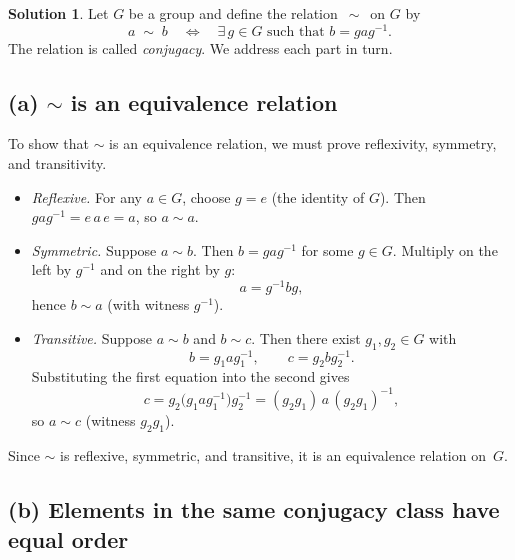 \documentclass[12pt]{article}
\theoremstyle{definition} %
\newtheorem{solution}{Solution}
\theoremstyle{plain} %
\begin{document}
  \begin{solution}
    Let $G$ be a group and define the relation $\,\sim\,$ on $G$ by  
    \[
         a\;\sim\;b 
         \quad\Longleftrightarrow\quad 
         \exists\,g\in G \text{ such that } b = g a g^{-1}.
    \]
    The relation is called \emph{conjugacy}.  We address each part in turn.
    
    \subsection*{(a)  $\sim$ is an equivalence relation}
    
    To show that $\sim$ is an equivalence relation, we must prove reflexivity, symmetry, and transitivity.
    
    \begin{itemize}
        \item\emph{Reflexive.}  
              For any $a\in G$, choose $g=e$ (the identity of $G$).  
              Then $gag^{-1}=e\,a\,e=a$, so $a\sim a$.
    
        \item\emph{Symmetric.}  
              Suppose $a\sim b$.  
              Then $b=gag^{-1}$ for some $g\in G$.  
              Multiply on the left by $g^{-1}$ and on the right by $g$:
              \[
                  a = g^{-1} b g,
              \]
              hence $b\sim a$ (with witness $g^{-1}$).
    
        \item\emph{Transitive.}  
              Suppose $a\sim b$ and $b\sim c$.  
              Then there exist $g_1,g_2\in G$ with
              \[
                  b=g_1 a g_1^{-1},
                  \qquad
                  c=g_2 b g_2^{-1}.
              \]
              Substituting the first equation into the second gives
              \[
                  c 
                  = g_2 \bigl(g_1 a g_1^{-1}\bigr) g_2^{-1}
                  = (g_2 g_1)\,a\,(g_2 g_1)^{-1},
              \]
              so $a\sim c$ (witness $g_2 g_1$).
    \end{itemize}
    Since $\sim$ is reflexive, symmetric, and transitive, it is an equivalence relation on~$G$.
    
    \subsection*{(b)  Elements in the same conjugacy class have equal order}
    

\end{solution}
\end{document}
